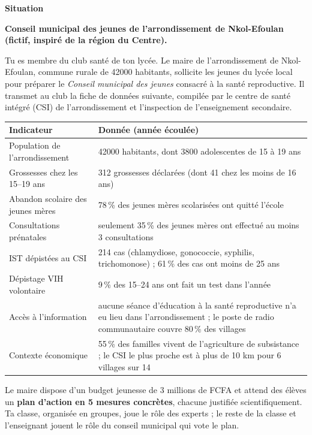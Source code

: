 \documentclass[11pt]{article}
\begin{document}
\textbf{Situation}\par

\textbf{Conseil municipal des jeunes de l'arrondissement de Nkol-Efoulan (fictif, inspiré de la région du Centre).}

Tu es membre du club santé de ton lycée. Le maire de l'arrondissement de Nkol-Efoulan, commune rurale de \num{42 000} habitants, sollicite les jeunes du lycée local pour préparer le \emph{Conseil municipal des jeunes} consacré à la santé reproductive. Il transmet au club la fiche de données suivante, compilée par le centre de santé intégré (CSI) de l'arrondissement et l'inspection de l'enseignement secondaire.

\begin{center}
\begin{tabularx}{\linewidth}{|l|X|}
\hline
\rowcolor{popblueL} \textbf{Indicateur} & \textbf{Donnée (année écoulée)} \\
\hline
Population de l'arrondissement & \num{42 000} habitants, dont \num{3 800} adolescentes de 15 à 19 ans \\
\hline
Grossesses chez les 15--19 ans & 312 grossesses déclarées (dont 41 chez les moins de 16 ans) \\
\hline
Abandon scolaire des jeunes mères & 78\,\% des jeunes mères scolarisées ont quitté l'école \\
\hline
Consultations prénatales & seulement 35\,\% des jeunes mères ont effectué au moins 3 consultations \\
\hline
IST dépistées au CSI & 214 cas (chlamydiose, gonococcie, syphilis, trichomonose) ; 61\,\% des cas ont moins de 25 ans \\
\hline
Dépistage VIH volontaire & 9\,\% des 15--24 ans ont fait un test dans l'année \\
\hline
Accès à l'information & aucune séance d'éducation à la santé reproductive n'a eu lieu dans l'arrondissement ; le poste de radio communautaire couvre 80\,\% des villages \\
\hline
Contexte économique & 55\,\% des familles vivent de l'agriculture de subsistance ; le CSI le plus proche est à plus de 10 km pour 6 villages sur 14 \\
\hline
\end{tabularx}
\end{center}

Le maire dispose d'un budget jeunesse de 3 millions de FCFA et attend des élèves un \textbf{plan d'action en 5 mesures concrètes}, chacune justifiée scientifiquement. Ta classe, organisée en groupes, joue le rôle des experts ; le reste de la classe et l'enseignant jouent le rôle du conseil municipal qui vote le plan.
\end{document}
